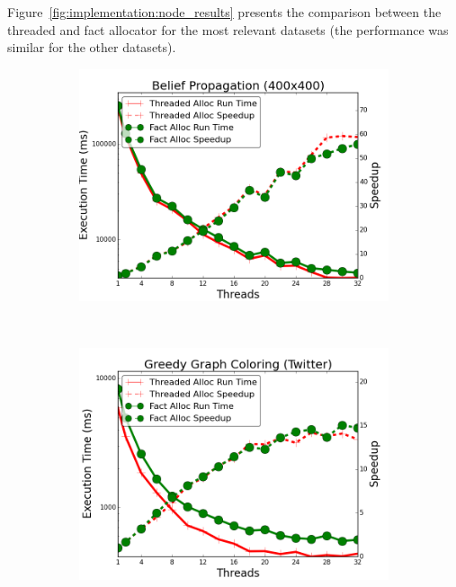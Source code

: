 Figure~\ref{fig:implementation:node_results} presents the comparison between the
threaded and fact allocator for the most relevant datasets (the performance was
similar for the other datasets).

\begin{figure}[h]
        \begin{subfigure}[b]{\smallplotsize\textwidth}
                \includegraphics[width=\textwidth]{experiments/scalability/node-allocator-belief-propagation-400.png}
                \label{fig:implementation:node_bp}
        \end{subfigure}
        ~
        \begin{subfigure}[b]{\smallplotsize\textwidth}
                \includegraphics[width=\textwidth]{experiments/scalability/node-allocator-greedy-graph-coloring-twitter.png}

\end{subfigure}
\end{figure}

